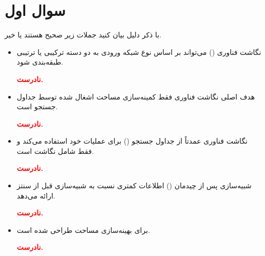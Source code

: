 \section{سوال اول}





با ذکر دلیل بیان کنید جملات زیر صحیح هستند یا خیر.
\begin{itemize}
	\item نگاشت فناوری () می‌تواند بر اساس نوع شبکه ورودی به دو دسته ترکیبی یا ترتیبی طبقه‌بندی شود.
	
	\begin{qsolve}
		\textbf{\textcolor{red}{نادرست.}}\\
	\end{qsolve}
	
	
	\item هدف اصلی نگاشت فناوری  فقط کمینه‌سازی مساحت اشغال شده توسط جداول جستجو است.
	\begin{qsolve}
		\textbf{\textcolor{red}{نادرست.}}\\
	\end{qsolve}
	
	
	
	\item نگاشت فناوری  عمدتاً از جداول جستجو () برای عملیات خود استفاده می‌کند و فقط شامل نگاشت  است.
	\begin{qsolve}
		\textbf{\textcolor{red}{نادرست.}}\\
	\end{qsolve}
	
	
	
	
	\item شبیه‌سازی پس از چیدمان () اطلاعات کمتری نسبت به شبیه‌سازی قبل از سنتز ارائه می‌دهد.
	\begin{qsolve}
		\textbf{\textcolor{red}{نادرست.}}\\
	\end{qsolve}
	
	
	
	
	\item {} برای بهینه‌سازی مساحت طراحی شده است.
	\begin{qsolve}
		\textbf{\textcolor{red}{نادرست.}}\\
	\end{qsolve}
	

\end{itemize}
